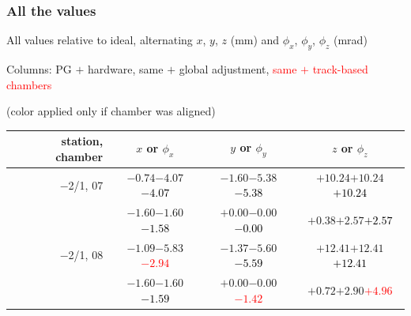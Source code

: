 \documentclass[compress]{beamer}
\begin{document}
\begin{frame}
\frametitle{All the values}
\tiny

All values relative to ideal, alternating $x$, $y$, $z$ (mm) and $\phi_x$, $\phi_y$, $\phi_z$ (mrad)

Columns: PG $+$ hardware, same $+$ global adjustment, \textcolor{red}{same $+$ track-based chambers}

\hfill (color applied only if chamber was aligned)

\vfill
\renewcommand{\arraystretch}{1.1}
\begin{tabular}{r | c | c | c}
station, chamber & $x$ or $\phi_x$ & $y$ or $\phi_y$ & $z$ or $\phi_z$ \\\hline
$-$2/1, 07 & $-0.74$\hspace{0.1 cm}$-4.07$\hspace{0.1 cm}\textcolor{black}{$-4.07$} & $-1.60$\hspace{0.1 cm}$-5.38$\hspace{0.1 cm}\textcolor{black}{$-5.38$} & $+10.24$\hspace{0.1 cm}$+10.24$\hspace{0.1 cm}\textcolor{black}{$+10.24$} \\
           & $-1.60$\hspace{0.1 cm}$-1.60$\hspace{0.1 cm}\textcolor{black}{$-1.58$} & $+0.00$\hspace{0.1 cm}$-0.00$\hspace{0.1 cm}\textcolor{black}{$-0.00$} & $+0.38$\hspace{0.1 cm}$+2.57$\hspace{0.1 cm}\textcolor{black}{$+2.57$} \\
$-$2/1, 08 & $-1.09$\hspace{0.1 cm}$-5.83$\hspace{0.1 cm}\textcolor{red}{$-2.94$} & $-1.37$\hspace{0.1 cm}$-5.60$\hspace{0.1 cm}\textcolor{black}{$-5.59$} & $+12.41$\hspace{0.1 cm}$+12.41$\hspace{0.1 cm}\textcolor{black}{$+12.41$} \\
           & $-1.60$\hspace{0.1 cm}$-1.60$\hspace{0.1 cm}\textcolor{black}{$-1.59$} & $+0.00$\hspace{0.1 cm}$-0.00$\hspace{0.1 cm}\textcolor{red}{$-1.42$} & $+0.72$\hspace{0.1 cm}$+2.90$\hspace{0.1 cm}\textcolor{red}{$+4.96$} \\

\end{tabular}
\end{frame}
\end{document}

